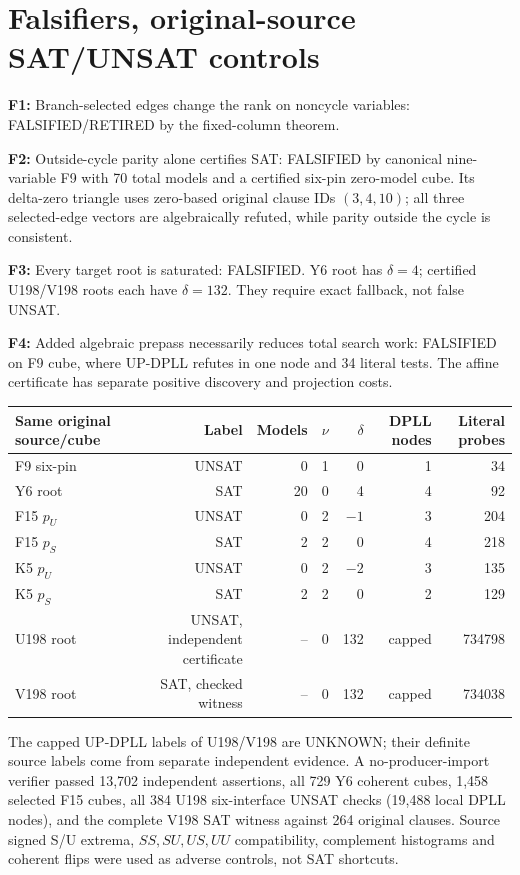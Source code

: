 \documentclass[11pt]{article}
\begin{document}
\section{Falsifiers, original-source SAT/UNSAT controls}
\noindent\textbf{F1:} Branch-selected edges change the rank on noncycle variables: FALSIFIED/RETIRED by the fixed-column theorem.
\par\noindent\textbf{F2:} Outside-cycle parity alone certifies SAT: FALSIFIED by canonical nine-variable F9 with 70 total models and a certified six-pin zero-model cube. Its delta-zero triangle uses zero-based original clause IDs $(3,4,10)$; all three selected-edge vectors are algebraically refuted, while parity outside the cycle is consistent.
\par\noindent\textbf{F3:} Every target root is saturated: FALSIFIED. Y6 root has $\delta=4$; certified U198/V198 roots each have $\delta=132$. They require exact fallback, not false UNSAT.
\par\noindent\textbf{F4:} Added algebraic prepass necessarily reduces total search work: FALSIFIED on F9 cube, where UP-DPLL refutes in one node and 34 literal tests. The affine certificate has separate positive discovery and projection costs.
\begin{center}\begin{tabular}{lrrrrrr}\toprule
Same original source/cube&Label&Models&$\nu$&$\delta$&DPLL nodes&Literal probes\\\midrule
F9 six-pin&UNSAT&0&1&0&1&34\\
Y6 root&SAT&20&0&4&4&92\\
F15 $p_U$&UNSAT&0&2&$-1$&3&204\\
F15 $p_S$&SAT&2&2&0&4&218\\
K5 $p_U$&UNSAT&0&2&$-2$&3&135\\
K5 $p_S$&SAT&2&2&0&2&129\\
U198 root&UNSAT, independent certificate&--&0&132&capped&734798\\
V198 root&SAT, checked witness&--&0&132&capped&734038\\\bottomrule\end{tabular}\end{center}
The capped UP-DPLL labels of U198/V198 are UNKNOWN; their definite source labels come from separate independent evidence. A no-producer-import verifier passed 13,702 independent assertions, all 729 Y6 coherent cubes, 1,458 selected F15 cubes, all 384 U198 six-interface UNSAT checks (19,488 local DPLL nodes), and the complete V198 SAT witness against 264 original clauses. Source signed S/U extrema, $SS,SU,US,UU$ compatibility, complement histograms and coherent flips were used as adverse controls, not SAT shortcuts.
\end{document}
